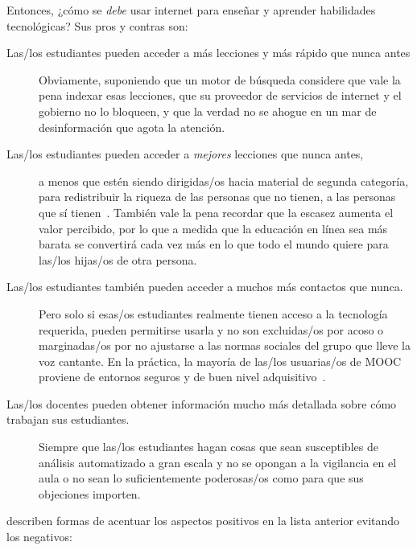 Entonces, ¿cómo se \emph{debe} usar internet para enseñar y aprender habilidades tecnológicas?
Sus pros y contras son:

\begin{description}

\item[Las/los estudiantes pueden acceder a más lecciones y más rápido que nunca antes]
  Obviamente,
  suponiendo
  que un motor de búsqueda considere que vale la pena indexar esas lecciones,
  que su proveedor de servicios de internet y el gobierno no lo bloqueen,
  y que la verdad no se ahogue en un mar de desinformación que agota la atención.

\item[Las/los estudiantes pueden acceder a \emph{mejores} lecciones que nunca antes,]
  a menos que estén siendo dirigidas/os hacia material de segunda categoría,
  para redistribuir la riqueza de las personas que no tienen, a las personas que sí tienen~\cite{McMi2017}.
  También vale la pena recordar que la escasez aumenta el valor percibido,
  por lo que a medida que la educación en línea sea más barata
  se convertirá cada vez más en lo que todo el mundo quiere para las/los hijas/os de otra persona.

\item[Las/los estudiantes también pueden acceder a muchos más contactos que nunca.]
  Pero solo si esas/os estudiantes realmente tienen acceso a la tecnología requerida,
  pueden permitirse usarla
  y no son excluidas/os por acoso o marginadas/os
  por no ajustarse a las normas sociales del grupo que lleve la voz cantante.
  En la práctica,
  la mayoría de las/los usuarias/os de MOOC proviene de entornos seguros y de buen nivel adquisitivo~\cite{Hans2015}.

\item[Las/los docentes pueden obtener información mucho más detallada sobre cómo trabajan sus estudiantes.]
  Siempre que las/los estudiantes hagan cosas que sean susceptibles de análisis automatizado a gran escala
  y no se opongan a la vigilancia en el aula
  o no sean lo suficientemente poderosas/os como para que sus objeciones importen.

\end{description}

\cite{Marg2015,Mill2016a,Nils2017} describen formas de acentuar los aspectos positivos en la lista anterior
evitando los negativos:


